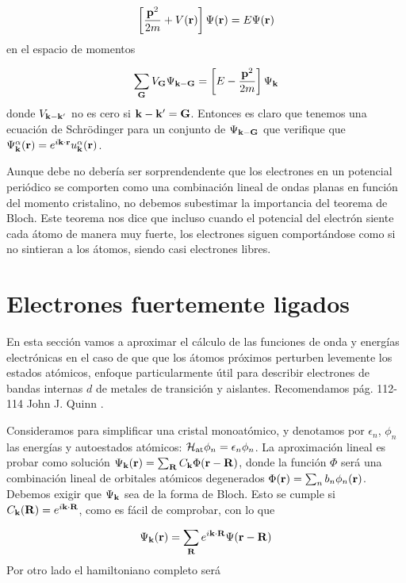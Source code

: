 \begin{equation}
	\left[ \frac{\mathbf{p}^2}{2m} + V(\mathbf{r}) \right] \Psi (\mathbf{r}) = E \Psi (\mathbf{r})
\end{equation}
en el espacio de momentos 


\begin{equation}
	\sum_{\mathbf{G}} V_{\mathbf{G}} \Psi_{\mathbf{k} - \mathbf{G}} =\left[ E-\frac{\mathbf{p}^2}{2m} \right]\Psi_{\mathbf{k} }
\end{equation}
donde $V_{\mathbf{k}-\mathbf{k}'}$ no es cero si $\mathbf{k}-\mathbf{k}'=\mathbf{G}$. Entonces es claro que tenemos una ecuación de Schrödinger para un conjunto de $\Psi_{\mathbf{k}-\mathbf{G}}$ que verifique que $\Psi_{\mathbf{k}}^\alpha (\mathbf{r}) = e^{i\mathbf{k} \cdot \mathbf{r}} u_{\mathbf{k}}^\alpha (\mathbf{r})$.

Aunque debe no debería ser sorprendendente que los electrones en un potencial periódico se comporten como una combinación lineal de ondas planas en función del momento cristalino, no debemos subestimar la importancia del teorema de Bloch. Este teorema nos dice que incluso cuando el potencial del electrón siente cada átomo de manera muy fuerte, los electrones siguen comportándose como si no sintieran a los átomos, siendo casi electrones libres. 



\section{Electrones fuertemente ligados}

En esta sección vamos a aproximar el cálculo de las funciones de onda y energías electrónicas en el caso de que que los átomos próximos perturben levemente los estados atómicos, enfoque particularmente útil para describir electrones de bandas internas $d$ de metales de transición y aislantes. Recomendamos pág. 112-114 John J. Quinn \cite{Quiin}.

Consideramos para simplificar una cristal monoatómico, y denotamos por $\epsilon_n$, $\phi_n$ las energías y autoestados atómicos: $\mathcal{H}_{\text{at}} \phi_n = \epsilon_n \phi_n$. La aproximación lineal es probar como solución $\Psi_{\mathbf{k}} (\mathbf{r}) = \sum_{\mathbf{R}} C_{\mathbf{k}} \Phi  (\mathbf{r} - \mathbf{R})$, donde la función $\Phi$ será una combinación lineal de orbitales atómicos degenerados $\Phi (\mathbf{r}) = \sum_n b_n \phi_n (\mathbf{r})$. Debemos exigir que $\Psi_{\mathbf{k}}$ sea de la forma de Bloch. Esto se cumple si $C_{\mathbf{k}} (\mathbf{R}) = e^{i \mathbf{k} \cdot \mathbf{R}}$, como es fácil de comprobar, con lo que 

\begin{equation}
	\Psi_{\mathbf{k}} (\mathbf{r}) = \sum_{\mathbf{R}} e^{i \mathbf{k} \cdot \mathbf{R}} \Psi (\mathbf{r} - \mathbf{R}) \label{Ec:07-05-01}
\end{equation} 
Por otro lado el hamiltoniano completo será 

